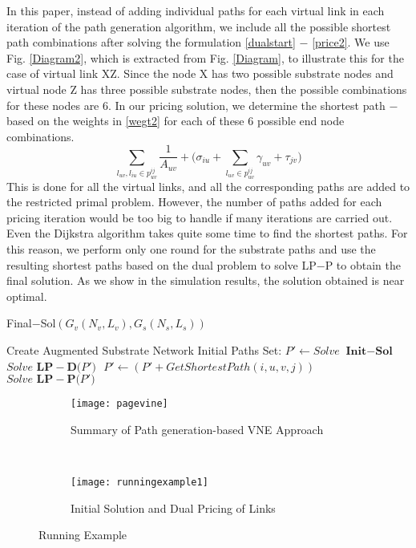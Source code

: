 \documentclass[journal]{IEEEtran}
\begin{document}
In this paper, instead of adding individual paths for each virtual link in each iteration of the path generation algorithm, we include all the possible shortest path combinations after solving the formulation \eqref{dualstart} $-$ \eqref{price2}. We use Fig. \ref{Diagram2}, which is extracted from Fig. \ref{Diagram}, to illustrate this for the case of virtual link XZ. Since the node X has two possible substrate nodes and virtual node Z has three possible substrate nodes, then the possible combinations for these nodes are 6. In our pricing solution, we determine the shortest path $-$ based on the weights in \eqref{wegt2} for each of these 6 possible end node combinations.
\begin{equation}
\sum \limits_{ l_{uv}, l_{iu}\in p_{uv}^{ij}} \frac{1}{A_{uv}} + \Bigg(\sigma_{iu} + \sum \limits_{l_{uv} \in p_{uv}^{ij}}\gamma_{uv} +  \tau_{jv}\Bigg)
\label{wegt2}
\end{equation}
This is done for all the virtual links, and all the corresponding paths are added to the restricted primal problem. However, the number of paths added for each pricing iteration would be too big to handle if many iterations are carried out. Even the Dijkstra algorithm takes quite some time to find the shortest paths. For this reason, we perform only one round for the substrate paths and use the resulting shortest paths based on the dual problem to solve LP$-$P to obtain the final solution. As we show in the simulation results, the solution obtained is near optimal.

\begin{algorithm}[t]
\caption{ Final$-$Sol$(G_v(N_v,L_v), G_s(N_s,L_s))$}
\label{ColGen}
\begin{algorithmic}[1]
\STATE Create Augmented Substrate Network
\STATE Initial Paths Set: $P'\leftarrow Solve \textbf{ Init$-$Sol}$
\STATE $Solve \textbf{ LP$-$D($P'$) }$
\STATE $P' \leftarrow (P' + GetShortestPath(i,u,v,j))$
\ENDFOR
\ENDFOR
\ENDFOR
\STATE $Solve \textbf{ LP$-$P($P'$) }$
\end{algorithmic}
\end{algorithm}

\begin{figure*}[ht!]
    \centering
        \begin{subfigure}[t]{0.4\textwidth}
        \centering
        \texttt{[image: pagevine]}
        \caption{Summary of Path generation-based VNE Approach}
        \label{cgfig}
    \end{subfigure}
     ~
    \begin{subfigure}[t]{0.58\textwidth}
        \centering
        \texttt{[image: runningexample1]}
        \caption{Initial Solution and Dual Pricing of Links}
        \label{runex2}
    \end{subfigure}   
    \caption{Running Example}
\end{figure*}
\end{document}
